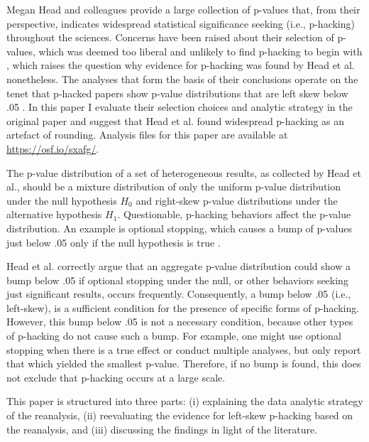 Megan Head and colleagues \cite{Head_2015} provide a large collection of p-values that, from their perspective, indicates widespread statistical significance seeking (i.e., p-hacking) throughout the sciences. Concerns have been raised about their selection of p-values, which was deemed too liberal and unlikely to find p-hacking to begin with \cite{Simonsohn2015-av}, which raises the question why evidence for p-hacking was found by Head et al. nonetheless. The analyses that form the basis of their conclusions operate on the tenet that p-hacked papers show p-value distributions that are left skew below .05 \cite{Simonsohn2014}. In this paper I evaluate their selection choices and analytic strategy in the original paper and suggest that Head et al. found widespread p-hacking as an artefact of rounding. Analysis files for this paper are available at \href{https://osf.io/sxafg/}{https://osf.io/sxafg/}.

The p-value distribution of a set of heterogeneous results, as collected by Head et al., should be a mixture distribution of only the uniform p-value distribution under the null hypothesis $H_0$ and right-skew p-value distributions under the alternative hypothesis $H_1$. Questionable, p-hacking behaviors affect the p-value distribution. An example is optional stopping, which causes a bump of p-values just below .05 only if the null hypothesis is true \cite{Lakens_2014}.

Head et al. correctly argue that an aggregate p-value distribution could show a bump below .05 if optional stopping under the null, or other behaviors seeking just significant results, occurs frequently. Consequently, a bump below .05 (i.e., left-skew), is a sufficient condition for the presence of specific forms of p-hacking. However, this bump below .05 is not a necessary condition, because other types of p-hacking do not cause such a bump. For example, one might use optional stopping when there is a true effect \cite{Lakens_2014} or conduct multiple analyses, but only report that which yielded the smallest p-value. Therefore, if no bump is found, this does not exclude that p-hacking occurs at a large scale.  

This paper is structured into three parts: (i) explaining the data analytic strategy of the reanalysis, (ii) reevaluating the evidence for left-skew p-hacking based on the reanalysis, and (iii) discussing the findings in light of the literature.
  
  
  